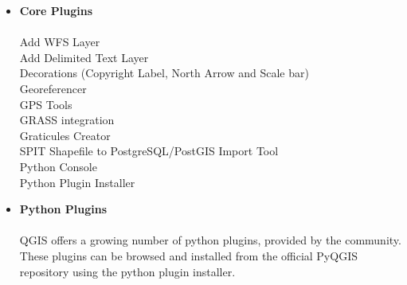\begin{itemize}
\item \textbf{Core Plugins}
\\ \\ Add WFS Layer
\\ Add Delimited Text Layer
\\ Decorations (Copyright Label, North Arrow and Scale bar)
\\ Georeferencer
\\ GPS Tools
\\ GRASS integration
\\ Graticules Creator
\\ SPIT Shapefile to PostgreSQL/PostGIS Import Tool
\\ Python Console
\\ Python Plugin Installer
\\ \item \textbf{Python Plugins}
\\ \\ QGIS offers a growing number of python plugins, provided by the
community. These plugins can be browsed and installed from the official
PyQGIS repository using the python plugin installer.
\end{itemize}








